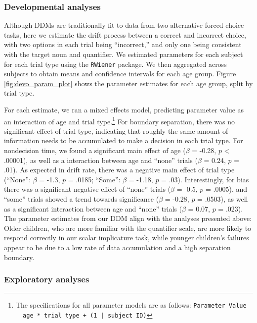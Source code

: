 \documentclass[10pt, letterpaper]{article}
\begin{document}
\subsubsection{Developmental analyses}\label{developmental-analyses}

Although DDMs are traditionally fit to data from two-alternative
forced-choice tasks, here we estimate the drift process between a
correct and incorrect choice, with two options in each trial being
``incorrect,'' and only one being consistent with the target noun and
quantifier. We estimated parameters for each subject for each trial type
using the \texttt{RWiener} package. We then aggregated across subjects
to obtain means and confidence intervals for each age group. Figure
\ref{fig:devo_param_plot} shows the parameter estimates for each age
group, split by trial type.

For each estimate, we ran a mixed effects model, predicting parameter
value as an interaction of age and trial
type.\footnote{The specifications for all parameter models are as follows: \texttt{Parameter Value ~ age * trial type + (1 | subject ID)}}
For boundary separation, there was no significant effect of trial type,
indicating that roughly the same amount of information needs to be
accumulated to make a decision in each trial type. For nondecision time,
we found a significant main effect of age (\(\beta\) = -0.28, \(p\)
\textless{} .00001), as well as a interaction between age and ``none''
trials (\(\beta\) = 0.24, \(p\) = .01). As expected in drift rate, there
was a negative main effect of trial type (``None'': \(\beta\) = -1.3,
\(p\) = .0185; ``Some'': \(\beta\) = -1.18, \(p\) = .03). Interestingly,
for bias there was a significant negative effect of ``none'' trials
(\(\beta\) = -0.5, \(p\) = .0005), and ``some'' trials showed a trend
towards significance (\(\beta\) = -0.28, \(p\) = .0503), as well as a
significant interaction between age and ``none'' trials (\(\beta\) =
0.07, \(p\) = .023). The parameter estimates from our DDM align with the
analyses presented above: Older children, who are more familiar with the
quantifier scale, are more likely to respond correctly in our scalar
implicature task, while younger children's failures appear to be due to
a low rate of data accumulation and a high separation boundary.

\subsubsection{Exploratory analyses}\label{exploratory-analyses}
\end{document}
